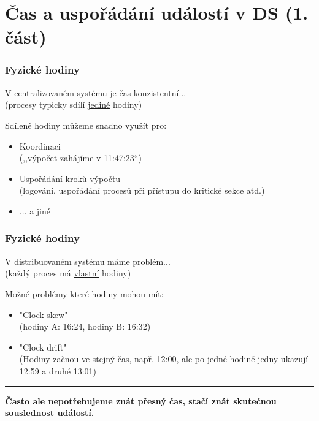 \documentclass[usenames,dvipsnames,9pt]{beamer}
\begin{document}
\section{Čas a uspořádání událostí v DS  (1. část)}

\begin{frame}
  \frametitle{Fyzické hodiny}


  {\LARGE V centralizovaném systému je čas konzistentní...} \\
  {\large (procesy typicky sdílí \underline{jediné} hodiny)}

  \vspace{1em}

  Sdílené hodiny můžeme snadno využít pro:
  \begin{itemize}
    \item Koordinaci \\
          {\small (,,výpočet zahájíme v 11:47:23``)}
    \item Uspořádání kroků výpočtu \\
          {\small (logování, uspořádání procesů při přístupu do kritické sekce atd.)}
    \item ... a jiné
  \end{itemize}

\end{frame}

\begin{frame}
  \frametitle{Fyzické hodiny}


  {\LARGE V distribuovaném systému máme problém...} \\
  {\large (každý proces má \underline{vlastní} hodiny)}

  \vspace{1em}

  Možné problémy které hodiny mohou mít:
  \begin{itemize}
    \pause
    \item "Clock skew" \\
          {\small (hodiny A: 16:24, hodiny B: 16:32)}
    \pause
    \item "Clock drift" \\
          {\small (Hodiny začnou ve stejný čas, např. 12:00, ale po jedné hodině jedny ukazují 12:59 a druhé 13:01)}
  \end{itemize}

  \pause
  \vspace{1em}
  \hrule
  \vspace{1em}
  \Large \faWarning \hspace{5pt} \bf Často ale nepotřebujeme znát přesný čas, stačí znát skutečnou souslednost událostí. 

\end{frame}
\end{document}
